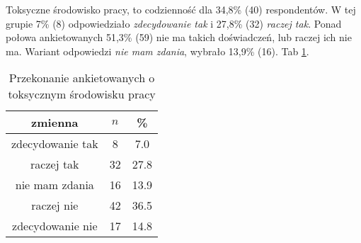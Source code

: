 



Toksyczne środowisko pracy, to codzienność dla 34,8\% (40) respondentów. W tej grupie 7\% (8) odpowiedziało \textit{zdecydowanie tak} i 27,8\% (32) \textit{raczej tak}. Ponad połowa ankietowanych 51,3\% (59) nie ma takich doświadczeń, lub raczej ich nie ma. Wariant odpowiedzi \textit{nie mam zdania}, wybrało 13,9\% (16). Tab \ref{tab:Q8}.

\begin{table}[H]
\caption{Przekonanie ankietowanych o toksycznym środowisku pracy}
\centering
\begin{tabular}{ | c | c | c |}
\hline
zmienna & $n$ & \% \\
\hline
zdecydowanie tak  &  8  & 7.0 \\
\hline
raczej tak  &  32  & 27.8 \\
\hline
nie mam zdania  &  16  & 13.9 \\
\hline
raczej nie  &  42  & 36.5 \\
\hline
zdecydowanie nie  &  17  & 14.8\\
\hline
\end{tabular}
\label{tab:Q8}
\end{table}
